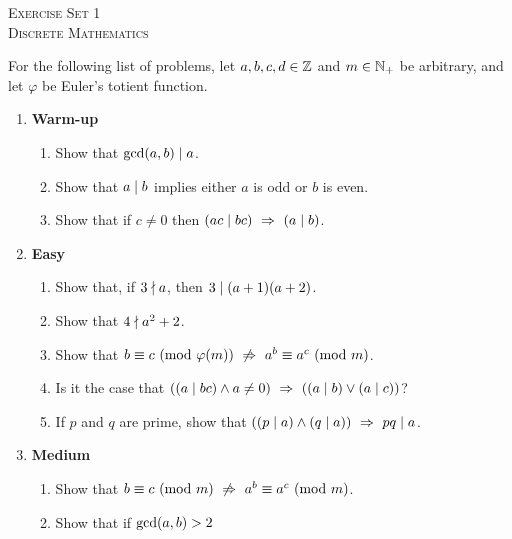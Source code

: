 




\begin{center}
    \textsc{\huge Exercise Set 1}\\
    \textsc{Discrete Mathematics}
\end{center}

For the following list of problems,
let $a, b, c, d \in \mathbb{Z}$ and $m \in \mathbb{N}_+$ be arbitrary,
and let $\varphi$ be Euler's totient function.
\begin{enumerate}
    \item \textbf{Warm-up}
        \begin{enumerate}
            \item
                Show that $\gcd\pn*{a, b} \divides a$.
            \item
                Show that $a \mid b$ implies either $a$ is odd or $b$ is even.
            \item
                Show that if $c \neq 0$ then $\pn*{ac \divides bc} \implies \pn*{a \divides b}$.
        \end{enumerate}
    \item \textbf{Easy}
        \begin{enumerate}
            \item
                Show that, if $3 \nmid a$, then $3 \mid (a + 1)(a + 2)$.
            \item
                Show that $4 \nmid a^2 + 2$.
            \item
                Show that $\modulo{b}{c}{\varphi(m)} \nimplies \modulo{a^b}{a^c}{m}$.
            \item
                Is it the case that $\pn*{\pn*{a \divides bc} \meet a \neq 0} \implies \pn*{\pn*{a \divides b} \join \pn*{a \divides c}}$?
            \item
                If $p$ and $q$ are prime,
                show that $\pn*{\pn*{p \divides a} \meet \pn*{q \divides a}} \implies pq \divides a$.
        \end{enumerate}
    \item \textbf{Medium}
        \begin{enumerate}
            \item
                Show that $\modulo{b}{c}{m} \nimplies \modulo{a^b}{a^c}{m}$.
            \item
                Show that if $\gcd\pn*{a, b} > 2$

\end{enumerate}
\end{enumerate}
